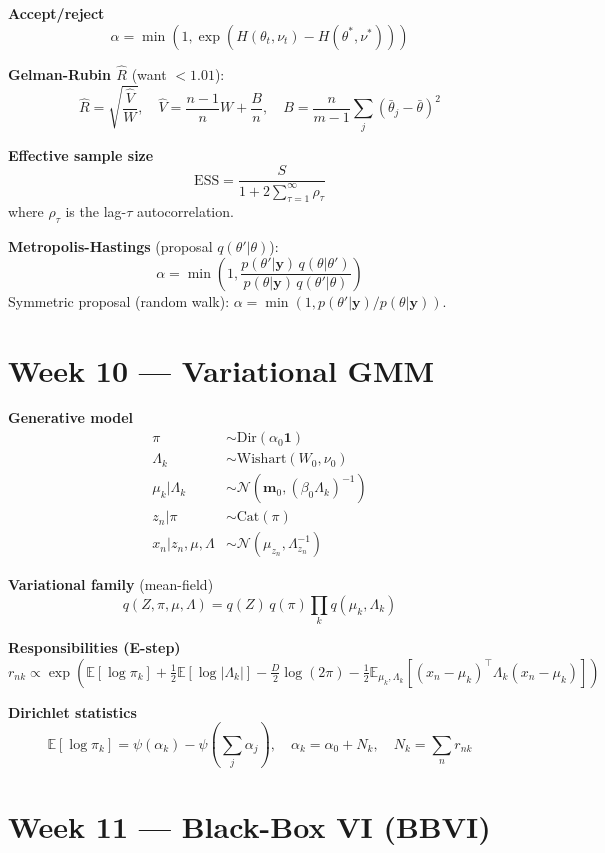 \documentclass[9pt,a4paper]{extarticle}
\newcommand{\N}{\mathcal{N}}
\newcommand{\E}{\mathbb{E}}
\renewcommand{\vec}[1]{\bm{#1}}
\begin{document}
\textbf{Accept/reject}
\[
\alpha = \min\!\left(1,\exp(H(\theta_t,\nu_t)-H(\theta^*,\nu^*))\right)
\]

\textbf{Gelman-Rubin $\hat{R}$} (want $<1.01$):
\[
\hat{R} = \sqrt{\frac{\hat{V}}{W}},\quad \hat{V}=\frac{n-1}{n}W + \frac{B}{n},\quad B=\frac{n}{m-1}\sum_j(\bar{\theta}_j-\bar{\theta})^2
\]

\textbf{Effective sample size}
\[
\text{ESS} = \frac{S}{1+2\sum_{\tau=1}^\infty \rho_\tau}
\]
where $\rho_\tau$ is the lag-$\tau$ autocorrelation.

\textbf{Metropolis-Hastings} (proposal $q(\theta'|\theta)$):
\[
\alpha = \min\!\left(1,\frac{p(\theta'|\vec{y})\,q(\theta|\theta')}{p(\theta|\vec{y})\,q(\theta'|\theta)}\right)
\]
Symmetric proposal (random walk): $\alpha=\min(1,p(\theta'|\vec{y})/p(\theta|\vec{y}))$.

\section{Week 10 — Variational GMM}

\textbf{Generative model}
\begin{align*}
\pi &\sim \mathrm{Dir}(\alpha_0\mathbf{1}) \\
\Lambda_k &\sim \mathrm{Wishart}(W_0,\nu_0) \\
\mu_k|\Lambda_k &\sim \N(\vec{m}_0,(\beta_0\Lambda_k)^{-1}) \\
z_n|\pi &\sim \mathrm{Cat}(\pi) \\
x_n|z_n,\mu,\Lambda &\sim \N(\mu_{z_n},\Lambda_{z_n}^{-1})
\end{align*}

\textbf{Variational family} (mean-field)
\[
q(Z,\pi,\mu,\Lambda)=q(Z)\,q(\pi)\prod_k q(\mu_k,\Lambda_k)
\]

\textbf{Responsibilities (E-step)}
\[
r_{nk} \propto \exp(\E[\log\pi_k]+\tfrac{1}{2}\E[\log|\Lambda_k|]-\tfrac{D}{2}\log(2\pi)-\tfrac{1}{2}\E_{\mu_k,\Lambda_k}[(x_n-\mu_k)^\top\Lambda_k(x_n-\mu_k)])
\]

\textbf{Dirichlet statistics}
\[
\E[\log\pi_k]=\psi(\alpha_k)-\psi\!\left(\sum_j\alpha_j\right),\quad\alpha_k=\alpha_0+N_k,\quad N_k=\sum_n r_{nk}
\]

\section{Week 11 — Black-Box VI (BBVI)}
\end{document}

